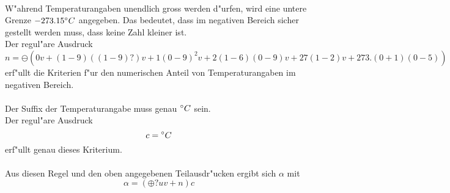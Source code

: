 \documentclass{article}
\newcommand{\degr}{\null \degree}
\begin{document}
\\
W"ahrend Temperaturangaben unendlich gross werden d"urfen, wird eine untere
    Grenze $-273.15 \degr C$ angegeben. Das bedeutet, dass im negativen Bereich
    sicher gestellt werden muss, dass keine Zahl kleiner ist.\\
    Der regul"are Ausdruck\[
        n = \ominus(
            0v
            + (1-9)((1-9)?)v    %
            + 1(0-9)^2v         %
            + 2(1-6)(0-9)v      %
            + 27(1-2)v          %
            + 273.(0+1)(0-5)    %
            )
        \] 
    erf"ullt die Kriterien f"ur den numerischen Anteil von Temperaturangaben im 
    negativen Bereich.\\
\\
Der Suffix der Temperaturangabe muss genau $\degr C$ sein.\\
Der regul"are Ausdruck\[
        c = \degr C
        \]
    erf"ullt genau dieses Kriterium.\\
\\
Aus diesen Regel und den oben angegebenen Teilausdr"ucken ergibt sich 
    $\alpha$ mit\[
        \alpha = (\oplus ? uv + n)c
        \]
\end{document}
